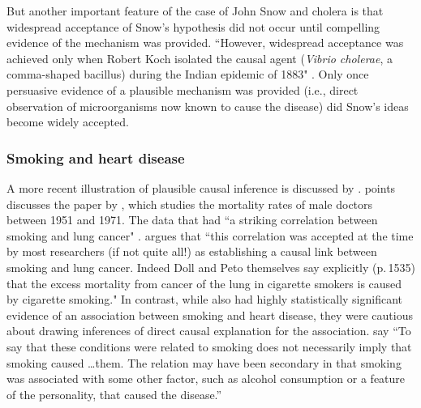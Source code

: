 \documentclass[11pt,reqno]{amsart}
\begin{document}
But another important feature of the case of John Snow and cholera is that widespread acceptance of Snow's hypothesis did not occur until compelling evidence of the mechanism was provided.
``However, widespread acceptance was achieved only when Robert Koch isolated the causal agent (\emph{Vibrio cholerae}, a comma-shaped bacillus) during the Indian epidemic of 1883"  \citep[p.\,342]{Freedman:2009ur}.
Only once persuasive evidence of a plausible mechanism was provided (i.e., direct observation of microorganisms now known to cause the disease) did Snow's ideas become widely accepted.

\subsubsection{Smoking and heart disease}
A more recent illustration of plausible causal inference is discussed by \citet{Gillies2011-GILTRT-3}.
 \citet{Gillies2011-GILTRT-3} points discusses the paper by \citet{Doll:1976aa}, which studies the mortality rates of male doctors between 1951 and 1971.
 The data that \citet{Doll:1976aa} had ``a striking correlation between smoking and lung cancer" \citep[p.\,111]{Gillies2011-GILTRT-3}.
 \citet{Gillies2011-GILTRT-3} argues that ``this correlation was accepted at the time by most researchers (if not quite all!) as establishing a causal link between smoking and lung cancer. Indeed Doll and Peto themselves say explicitly (p.\,1535) that the excess mortality from cancer of the lung in cigarette smokers is caused by cigarette smoking."
In contrast, while \citet{Doll:1976aa} also had highly statistically significant evidence of an association between smoking and heart disease, they were cautious about drawing inferences of direct causal explanation for the association.
\citet[p.\,1528]{Doll:1976aa} say ``To say that these conditions were related to smoking does not necessarily imply that smoking caused \dots them. The relation may have been secondary in that smoking was associated with some other factor, such as alcohol consumption or a feature of the personality, that caused the disease.''
 
\end{document}
